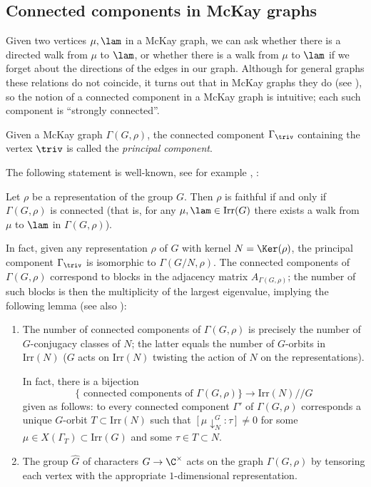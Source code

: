 \subsection{Connected components in McKay graphs}

Given two vertices $\mu, \lam$ in a McKay graph, we can ask whether there is a directed walk from $\mu$ to $\lam$, or whether there is a walk from $\mu$ to $\lam$ if we forget about the directions of the edges in our graph. Although for general graphs these relations do not coincide, it turns out that in McKay graphs they do (see \cite[Section 3]{Browne}), so the notion of a connected component in a McKay graph is intuitive; each such component is ``strongly connected''.

Given a McKay graph $\Gamma(G, \rho)$, the connected component $\Gamma_{\triv}$ containing the vertex $\triv$ is called the {\it principal component}.

The following statement is well-known, see for example \cite[Proposition 1]{McKay}, \cite[Proposition 3.3]{Browne}:
\begin{lemma}\label{lem:connectivity}
 Let $\rho$ be a representation of the group $G$. Then $\rho$ is faithful if and 
only if $\Gamma(G, \rho)$ is connected (that is, for any $\mu, \lam \in \mathrm{Irr}(G)$ 
there exists a walk from $\mu$ to $\lam$ in $\Gamma(G, \rho)$).
\end{lemma}


In fact, given any representation $\rho$ of $G$ with kernel $N = \Ker(\rho)$, the principal component $\Gamma_{\triv}$ is isomorphic to $\Gamma(G/N, \rho)$. 
The connected components of $\Gamma(G, \rho)$ correspond to blocks in the adjacency matrix $A_{\Gamma(G, \rho)}$; the number of such blocks is then the multiplicity of the largest eigenvalue, implying the following lemma (see also \cite[Proposition 3.10, Lemma 4.1]{Browne}):
\begin{lemma}\label{lem:connected_comp_Browne} 
\mbox{}
 \begin{enumerate}
  \item The number of connected components of $\Gamma(G, \rho)$ is precisely the number of $G$-conjugacy classes of $N$; the latter equals the number of $G$-orbits in $\mathrm{Irr}({N})$ ($G$ acts on $\mathrm{Irr}(N)$ twisting the action of $N$ on the representations).
  
  In fact, there is a bijection
  $$\{\text{ connected components of } \Gamma(G, \rho)\} \longrightarrow \mathrm{Irr}(N)//G$$
  given as follows: to every connected component $\Gamma'$ of $\Gamma(G, \rho)$ corresponds a unique $G$-orbit $T \subset \mathrm{Irr}(N)$ such that $[\mu \downarrow^G_N: \tau] \neq 0$ for some $\mu \in X(\Gamma_T) \subset \mathrm{Irr}(G)$ and some $\tau \in T \subset N$.
  \item The group $\widehat{G}$ of characters $G \to \C^{\times}$ acts on the graph $\Gamma(G, \rho)$ by tensoring each vertex with the appropriate $1$-dimensional representation.
 \end{enumerate}
 
 
\end{lemma}


